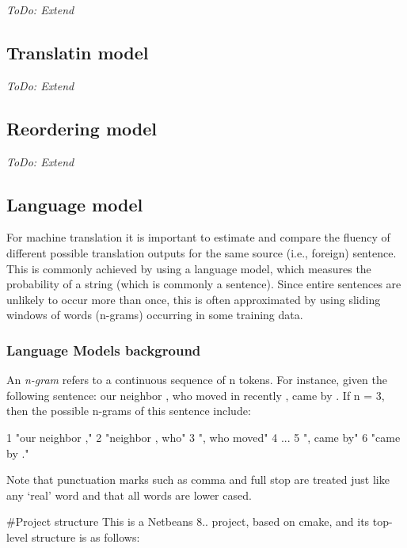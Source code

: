 {\itshape To\+Do\+: Extend}

\subsection*{Translatin model}

{\itshape To\+Do\+: Extend}

\subsection*{Reordering model}

{\itshape To\+Do\+: Extend}

\subsection*{Language model}

For machine translation it is important to estimate and compare the fluency of different possible translation outputs for the same source (i.\+e., foreign) sentence. This is commonly achieved by using a language model, which measures the probability of a string (which is commonly a sentence). Since entire sentences are unlikely to occur more than once, this is often approximated by using sliding windows of words (n-\/grams) occurring in some training data.

\subsubsection*{Language Models background}

An {\itshape n-\/gram} refers to a continuous sequence of n tokens. For instance, given the following sentence\+: our neighbor , who moved in recently , came by . If n = 3, then the possible n-\/grams of this sentence include\+: 
\begin{DoxyCode}
1 "our neighbor ,"
2 "neighbor , who"
3 ", who moved"
4 ...
5 ", came by"
6 "came by ."
\end{DoxyCode}


Note that punctuation marks such as comma and full stop are treated just like any ‘real’ word and that all words are lower cased.

\#\+Project structure This is a Netbeans 8.. project, based on cmake, and its\textquotesingle{} top-\/level structure is as follows\+:


